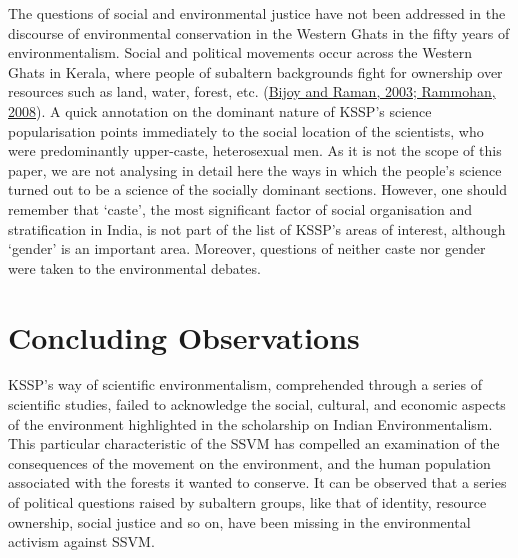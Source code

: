 \documentclass[twoside, 13pt]{article}
\begin{document}
{{{{{\fontsize{12}{14}\selectfont The questions of social and environmental justice have not been addressed in the discourse of environmental conservation in the Western Ghats in the fifty years of environmentalism. Social and political movements occur across the Western Ghats in Kerala, where people of subaltern backgrounds fight for ownership over resources such as land, water, forest, etc. (\underline{Bijoy and Raman, 2003; Rammohan, 2008}). A quick annotation on the dominant nature of KSSP’s science popularisation points immediately to the social location of the scientists, who were predominantly upper-caste, heterosexual men. As it is not the scope of this paper, we are not analysing in detail here the ways in which the people’s science turned out to be a science of the socially dominant sections. However, one should remember that ‘caste’, the most significant factor of social organisation and stratification in India, is not part of the list of KSSP’s areas of interest, although ‘gender’ is an important area. Moreover, questions of neither caste nor gender were taken to the environmental debates. }


\vspace{-.6cm}

{\fontsize{18}{20}\selectfont\section*{Concluding Observations}}

\vspace{-.2cm}

{\fontsize{12}{14}\selectfont KSSP’s way of scientific environmentalism, comprehended through a series of scientific studies, failed to acknowledge the social, cultural, and economic aspects of the environment highlighted in the scholarship on Indian Environmentalism. This particular characteristic of the SSVM has compelled an examination of the consequences of the movement on the environment, and the human population associated with the forests it wanted to conserve. It can be observed that a series of political questions raised by subaltern groups, like that of identity, resource ownership, social justice and so on, have been missing in the environmental activism against SSVM. 

}}}}}
\end{document}
